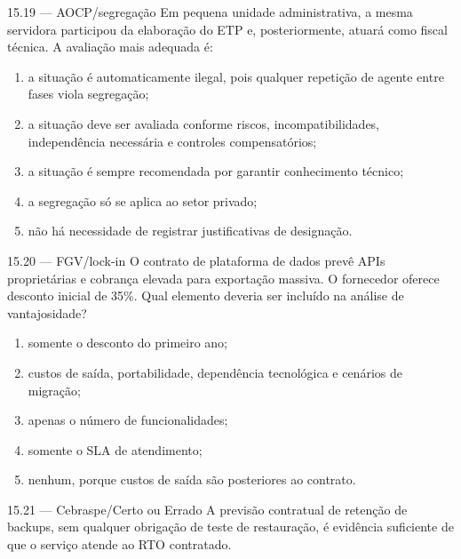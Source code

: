 \begin{questao}{ 15.19 — AOCP/segregação}
Em pequena unidade administrativa, a mesma servidora participou da elaboração do ETP e, posteriormente, atuará como fiscal técnica. A avaliação mais adequada é:
\begin{enumerate}[label=\Alph*)]
\item a situação é automaticamente ilegal, pois qualquer repetição de agente entre fases viola segregação;
\item a situação deve ser avaliada conforme riscos, incompatibilidades, independência necessária e controles compensatórios;
\item a situação é sempre recomendada por garantir conhecimento técnico;
\item a segregação só se aplica ao setor privado;
\item não há necessidade de registrar justificativas de designação.
\end{enumerate}
\end{questao}

\begin{questao}{ 15.20 — FGV/lock-in}
O contrato de plataforma de dados prevê APIs proprietárias e cobrança elevada para exportação massiva. O fornecedor oferece desconto inicial de 35\%. Qual elemento deveria ser incluído na análise de vantajosidade?
\begin{enumerate}[label=\Alph*)]
\item somente o desconto do primeiro ano;
\item custos de saída, portabilidade, dependência tecnológica e cenários de migração;
\item apenas o número de funcionalidades;
\item somente o SLA de atendimento;
\item nenhum, porque custos de saída são posteriores ao contrato.
\end{enumerate}
\end{questao}

\begin{questao}{ 15.21 — Cebraspe/Certo ou Errado}
A previsão contratual de retenção de backups, sem qualquer obrigação de teste de restauração, é evidência suficiente de que o serviço atende ao RTO contratado.
\end{questao}

